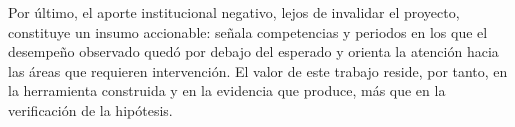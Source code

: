 Por último, el aporte institucional negativo, lejos de invalidar el proyecto, constituye un insumo accionable: señala competencias y periodos en los que el desempeño observado quedó por debajo del esperado y orienta la atención hacia las áreas que requieren intervención. El valor de este trabajo reside, por tanto, en la herramienta construida y en la evidencia que produce, más que en la verificación de la hipótesis.